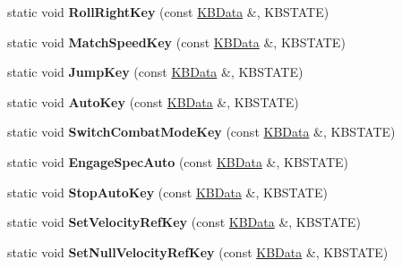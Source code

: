\begin{DoxyCompactItemize}
\item 
static void {\bfseries Roll\+Right\+Key} (const \hyperlink{classKBData}{K\+B\+Data} \&, K\+B\+S\+T\+A\+TE)\hypertarget{classFlyByKeyboard_ad3b8995c7c2ef7f879838a4f4563ba92}{}\label{classFlyByKeyboard_ad3b8995c7c2ef7f879838a4f4563ba92}

\item 
static void {\bfseries Match\+Speed\+Key} (const \hyperlink{classKBData}{K\+B\+Data} \&, K\+B\+S\+T\+A\+TE)\hypertarget{classFlyByKeyboard_aeb0bb9919a4731a575db0e43f3ae7814}{}\label{classFlyByKeyboard_aeb0bb9919a4731a575db0e43f3ae7814}

\item 
static void {\bfseries Jump\+Key} (const \hyperlink{classKBData}{K\+B\+Data} \&, K\+B\+S\+T\+A\+TE)\hypertarget{classFlyByKeyboard_ad67a243e11825aed571814051095316c}{}\label{classFlyByKeyboard_ad67a243e11825aed571814051095316c}

\item 
static void {\bfseries Auto\+Key} (const \hyperlink{classKBData}{K\+B\+Data} \&, K\+B\+S\+T\+A\+TE)\hypertarget{classFlyByKeyboard_a6d41f5ed0bd93a296aeee8c66f59bcf2}{}\label{classFlyByKeyboard_a6d41f5ed0bd93a296aeee8c66f59bcf2}

\item 
static void {\bfseries Switch\+Combat\+Mode\+Key} (const \hyperlink{classKBData}{K\+B\+Data} \&, K\+B\+S\+T\+A\+TE)\hypertarget{classFlyByKeyboard_acef5e4003e04dbb31d495ccd9e92e927}{}\label{classFlyByKeyboard_acef5e4003e04dbb31d495ccd9e92e927}

\item 
static void {\bfseries Engage\+Spec\+Auto} (const \hyperlink{classKBData}{K\+B\+Data} \&, K\+B\+S\+T\+A\+TE)\hypertarget{classFlyByKeyboard_ab1e1b7a1d4403193697addeedf27a350}{}\label{classFlyByKeyboard_ab1e1b7a1d4403193697addeedf27a350}

\item 
static void {\bfseries Stop\+Auto\+Key} (const \hyperlink{classKBData}{K\+B\+Data} \&, K\+B\+S\+T\+A\+TE)\hypertarget{classFlyByKeyboard_a01d775f8f47ae91009d2c9086fcbee81}{}\label{classFlyByKeyboard_a01d775f8f47ae91009d2c9086fcbee81}

\item 
static void {\bfseries Set\+Velocity\+Ref\+Key} (const \hyperlink{classKBData}{K\+B\+Data} \&, K\+B\+S\+T\+A\+TE)\hypertarget{classFlyByKeyboard_ac69093204bd003c91fa2ef02fa454fb8}{}\label{classFlyByKeyboard_ac69093204bd003c91fa2ef02fa454fb8}

\item 
static void {\bfseries Set\+Null\+Velocity\+Ref\+Key} (const \hyperlink{classKBData}{K\+B\+Data} \&, K\+B\+S\+T\+A\+TE)\hypertarget{classFlyByKeyboard_a1f1fc443add8546accc1a99343d39c70}{}\label{classFlyByKeyboard_a1f1fc443add8546accc1a99343d39c70}

\end{DoxyCompactItemize}
